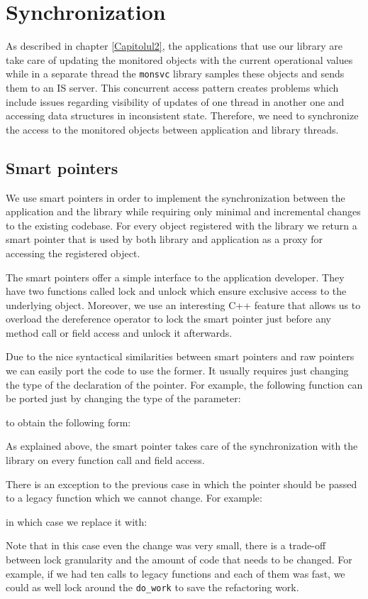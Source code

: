 \chapter{Synchronization} %
\label{Capitolul5}


As described in chapter \ref{Capitolul2}, the applications that use our library are take care of updating the monitored objects with the current operational values while in a separate thread the {\tt monsvc} library samples these objects and sends them to an IS server. This concurrent access pattern creates problems which include issues regarding visibility of updates of one thread in another one and accessing data structures in inconsistent state. Therefore, we need to synchronize the access to the monitored objects between application and library threads.

\section*{Smart pointers}

We use smart pointers in order to implement the synchronization between the application and the library while requiring only minimal and incremental changes to the existing codebase. For every object registered with the library we return a smart pointer that is used by both library and application as a proxy for accessing the registered object. 

The smart pointers offer a simple interface to the application developer. They have two functions called lock and unlock which ensure exclusive access to the underlying object. Moreover, we use an interesting C++ feature \citep{andrei2001modern} that allows us to overload the dereference operator to lock the smart pointer just before any method call or field access and unlock it afterwards.

Due to the nice syntactical similarities between smart pointers and raw pointers we can easily port the code to use the former. It usually requires just changing the type of the declaration of the pointer. For example, the following function can be ported just by changing the type of the parameter:

to obtain the following form:

As explained above, the smart pointer takes care of the synchronization with the library on every function call and field access.

There is an exception to the previous case in which the pointer should be passed to a legacy function which we cannot change. For example:

in which case we replace it with:

Note that in this case even the change was very small, there is a trade-off between lock granularity and the amount of code that needs to be changed. For example, if we had ten calls to legacy functions and each of them was fast, we could as well lock around the \verb+do_work+ to save the refactoring work.

